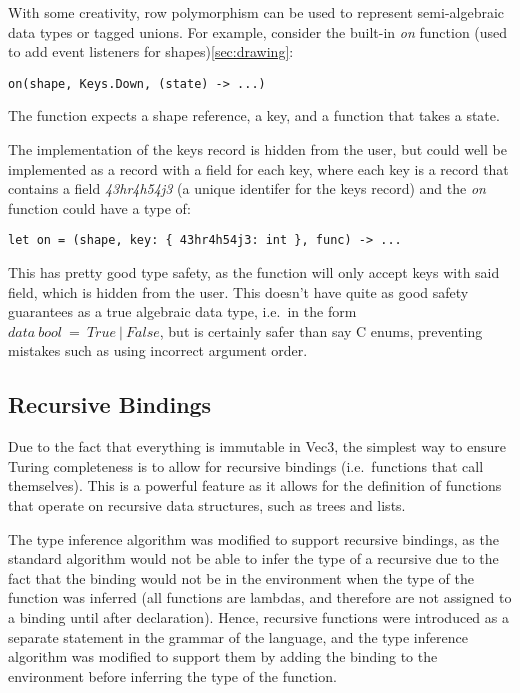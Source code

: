 With some creativity, row polymorphism can be used to represent semi-algebraic data types or tagged unions.
For example, consider the built-in \textit{on} function (used to add event listeners for shapes)\ref{sec:drawing}:

\begin{verbatim}
on(shape, Keys.Down, (state) -> ...)
\end{verbatim}

The function expects a shape reference, a key, and a function that takes a state.

The implementation of the keys record is hidden from the user, but could well be implemented as a record with a field
for each key, where each key is a record that contains a field 
\textit{43hr4h54j3} (a unique identifer for the keys record) and the \textit{on} function could have a type of:
\begin{verbatim}
let on = (shape, key: { 43hr4h54j3: int }, func) -> ...
\end{verbatim}

This has pretty good type safety, as the function will only accept keys with said field, which is hidden from the user.
This doesn't have quite as good safety guarantees as a true algebraic data type, i.e.\ in the form 
$data\ bool\ =\ True\ |\ False$, but is certainly safer than say C enums, preventing mistakes such as using incorrect 
argument order.

\subsection{Recursive Bindings}\label{subsec:recursive-bindings}

Due to the fact that everything is immutable in Vec3, the simplest way to ensure Turing completeness is to allow for 
recursive bindings (i.e.\ functions that call themselves).
This is a powerful feature as it allows for the definition of functions that operate on recursive data structures, such
as trees and lists.

The type inference algorithm was modified to support recursive bindings, as the standard algorithm would not be able to
infer the type of a recursive due to the fact that the binding would not be in the environment when the type of the
function was inferred (all functions are lambdas, and therefore are not assigned to a binding until after declaration).
Hence, recursive functions were introduced as a separate statement in the grammar of the language, and the type
inference algorithm was modified to support them by adding the binding to the environment before inferring the type of
the function.

